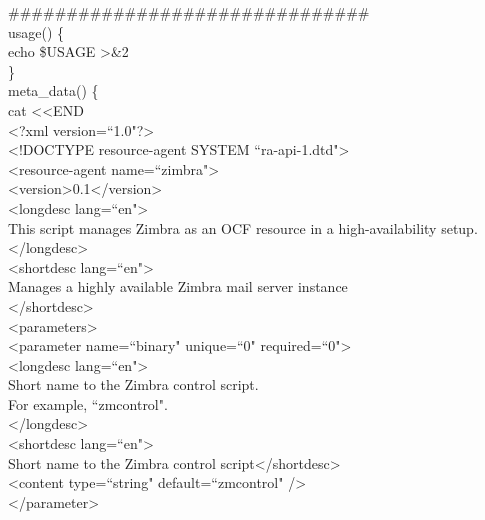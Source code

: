 \documentclass[a4paper, 12pt]{book}
\begin{document}
\noindent \#\#\#\#\#\#\#\#\#\#\#\#\#\#\#\#\#\#\#\#\#\#\#\#\#\#\#\#\#\#\#\\

\noindent usage() \{\\
    \indent echo \$USAGE \textgreater\&2\\
\}\\

\noindent meta\_data() \{\\

\noindent cat \textless \textless END\\
        
\noindent \textless ?xml version=``1.0"?\textgreater\\
\textless !DOCTYPE resource-agent SYSTEM ``ra-api-1.dtd"\textgreater\\
\textless resource-agent name=``zimbra"\textgreater\\
\textless version\textgreater0.1\textless /version\textgreater\\
\textless longdesc lang=``en"\textgreater\\
\indent This script manages Zimbra as an OCF resource in a high-availability setup.\\
\textless /longdesc\textgreater\\
\textless shortdesc lang=``en"\textgreater\\
\indent Manages a highly available Zimbra mail server instance\\
\textless /shortdesc\textgreater\\

\noindent \textless parameters\textgreater\\

\noindent \textless parameter name=``binary" unique=``0" required=``0"\textgreater\\
\textless longdesc lang=``en"\textgreater\\
\indent Short name to the Zimbra control script.\\
\indent For example, ``zmcontrol".\\
\textless /longdesc\textgreater\\
\textless shortdesc lang=``en"\textgreater\\
\indent Short name to the Zimbra control script\textless /shortdesc\textgreater\\
\textless content type=``string" default=``zmcontrol" /\textgreater\\
\textless /parameter\textgreater\\
\end{document}
